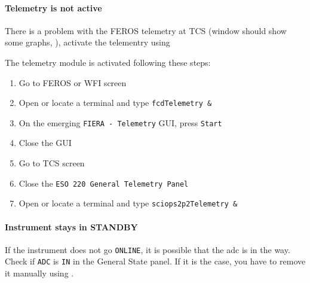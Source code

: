 \documentclass[11pt,fleqn,a4paper]{book}
\begin{document}
\paragraph{Telemetry is not active}

There is a problem with the FEROS \gls{telemetry} at TCS (window should show some graphs, ), activate the telementry using 

The \gls{telemetry} module is activated following these steps:
\label{proc:telemetry}
\begin{enumerate}
    \item Go to FEROS or WFI screen
    \item Open or locate a terminal and type \texttt{\gls{fcdTelemetry} \&}
    \item On the emerging \texttt{FIERA - Telemetry} GUI, press \texttt{Start}
    \item Close the GUI
    \item Go to TCS screen
    \item Close the \texttt{ESO 220 General Telemetry Panel}
    \item Open or locate a terminal and type \texttt{sciops2p2Telemetry \&}
\end{enumerate}

\paragraph{Instrument stays in STANDBY}

If the instrument does not go \texttt{ONLINE}, it is possible that the \gls{adc} is in the way. Check if \texttt{ADC} is \texttt{IN} in the \gls{General State} 
panel. If it is the case, you have to remove it manually using .
\end{document}
